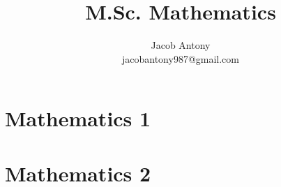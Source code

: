 \documentclass[a4paper,12pt,openany]{book}
\title{M.Sc. Mathematics}
\author{Jacob Antony\\jacobantony987@gmail.com}
\begin{document}

\part{Mathematics 1}



\part{Mathematics 2}
%



%
%
%
%

%


\end{document}
